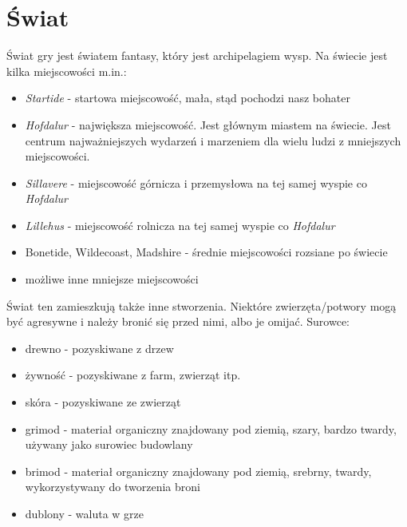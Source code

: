 \documentclass[12pt]{article}
\begin{document}
	\section{Świat}
	Świat gry jest światem fantasy, który jest archipelagiem wysp. Na świecie jest kilka miejscowości m.in.:
	\begin{itemize}
		\item \textit{Startide} - startowa miejscowość, mała, stąd pochodzi nasz bohater
		\item \textit{Hofdalur} - największa miejscowość. Jest głównym miastem na świecie. Jest centrum najważniejszych wydarzeń i marzeniem dla wielu ludzi z mniejszych miejscowości.
		\item \textit{Sillavere} - miejscowość górnicza i przemysłowa na tej samej wyspie co \textit{Hofdalur}
		\item \textit{Lillehus} - miejscowość rolnicza na tej samej wyspie co \textit{Hofdalur}
		\item Bonetide, Wildecoast, Madshire - średnie miejscowości rozsiane po świecie
		\item możliwe inne mniejsze miejscowości
	\end{itemize} 
	Świat ten zamieszkują także inne stworzenia.
	Niektóre zwierzęta/potwory mogą być agresywne i należy bronić się przed nimi, albo je omijać.
	\newline
	\newline
	Surowce:
	\begin{itemize}
		\item drewno - pozyskiwane z drzew
		\item żywność - pozyskiwane z farm, zwierząt itp.
		\item skóra - pozyskiwane ze zwierząt
		\item grimod - materiał organiczny znajdowany pod ziemią, szary, bardzo twardy, używany jako surowiec budowlany
		\item brimod - materiał organiczny znajdowany pod ziemią, srebrny, twardy, wykorzystywany do tworzenia broni
		\item dublony - waluta w grze
	\end{itemize}
\end{document}
